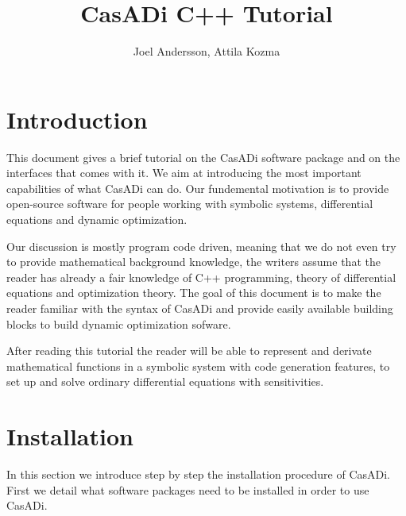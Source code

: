 \documentclass[a4paper,12pt]{book}
\author{Joel Andersson, Attila Kozma}
\title{CasADi C++ Tutorial }
\begin{document}
\titlepage
\maketitle
\begin{latexonly}
\tableofcontents
\end{latexonly}
\clearpage

\chapter{Introduction}
This document gives a brief tutorial on the CasADi software package and on the interfaces that comes with it. We aim at
introducing the most important capabilities of what CasADi can do. Our fundemental motivation is to provide open-source
software for people working with symbolic systems, differential equations and dynamic optimization.
\par Our discussion is mostly program code driven, meaning that
we do not even try to provide mathematical background knowledge, the writers assume that the reader has already a fair knowledge
of C++ programming, theory of differential equations and optimization theory. The goal of this document is to make the reader
 familiar with
the syntax of CasADi and provide easily available building blocks to build dynamic optimization sofware.
\par
After reading this tutorial the reader will be able to represent and derivate mathematical functions in a symbolic system with
code generation features, to
set up and solve ordinary differential equations with sensitivities.
\chapter{Installation}
In this section we introduce step by step the installation procedure of CasADi. First we detail what software packages need to
be installed in order to use CasADi.
\end{document}
